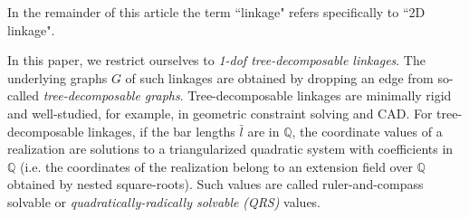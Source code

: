 \documentclass[prodmode,acmtoms]{acmsmall}
\begin{document}
 In the remainder of this article the term ``linkage" refers specifically to ``2D linkage". 


In this paper, we restrict ourselves to \emph{1-dof tree-decomposable linkages}.
The underlying graphs $G$ of such linkages 
are obtained by dropping an edge from so-called \emph{tree-decomposable graphs}. 
Tree-decomposable linkages are 
minimally rigid and well-studied, for example, in geometric constraint solving and CAD.
For tree-decomposable linkages, if the bar lengths $\bar{l}$ are in $\mathbb{Q}$, 
the coordinate values of a realization are solutions to 
a triangularized quadratic system with coefficients in $\mathbb{Q}$
(i.e. the coordinates of the realization belong to an extension field over $\mathbb{Q}$ obtained by nested square-roots). 
Such values are called ruler-and-compass solvable or \emph{quadratically-radically solvable} \emph{(QRS)} values.
\end{document}
